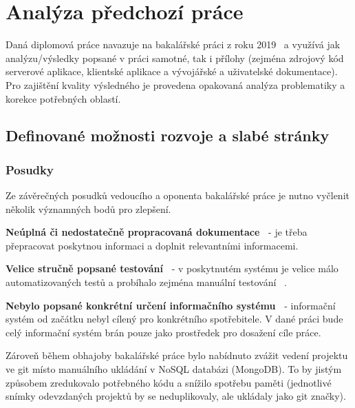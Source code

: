 \chapter{Analýza předchozí práce}\label{ch:analysis}



Daná diplomová práce navazuje na bakalářské práci z roku 2019~\cite{bachelorthesis} a využívá jak analýzu/výsledky popsané v práci samotné, tak i přílohy (zejména zdrojový kód serverové aplikace, klientské aplikace a vývojářské a uživatelské dokumentace).
Pro zajištění kvality výsledného  je provedena opakovaná analýza problematiky a korekce potřebných oblastí.



\section{Definované možnosti rozvoje a slabé stránky}



\subsection{Posudky}
Ze závěrečných posudků vedoucího a oponenta bakalářské práce je nutno vyčlenit několik významných bodů pro zlepšení.

\begin{ul}
   \item
   \textbf{Neúplná či nedostatečně propracovaná dokumentace~\cite{bachelorthesisreportsupervisor}} - je třeba přepracovat poskytnou informaci a doplnit relevantními informacemi.
   \item
   \textbf{Velice stručně popsané testování~\cite{bachelorthesisreportreviewer}} - v poskytnutém systému je velice málo automatizovaných testů a probíhalo zejména manuální testování~\cite{bachelorthesis} .
   \item
   \textbf{Nebylo popsané konkrétní určení informačního systému~\cite{bachelorthesisreportreviewer}} - informační systém od začátku nebyl cílený pro konkrétního spotřebitele.
   V dané práci bude celý informační systém brán pouze jako prostředek pro dosažení cíle práce.
\end{ul}

Zároveň během obhajoby bakalářské práce bylo nabídnuto zvážit vedení projektu ve  git místo manuálního ukládání v NoSQL databázi (MongoDB).
To by jistým způsobem zredukovalo potřebného kódu a snížilo spotřebu paměti (jednotlivé snímky odevzdaných projektů by se neduplikovaly, ale ukládaly jako git značky).



